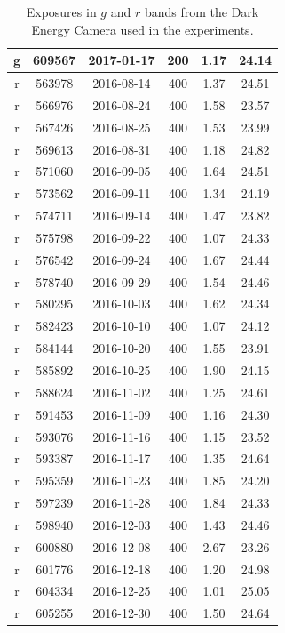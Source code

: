 \documentclass[letterpaper,preprint]{aastex62}
\begin{document}
\begin{table}
\begin{center}
\begin{scriptsize}
\begin{tabular}{cccccc}
      g & 609567 & 2017-01-17 & 200 & 1.17 & 24.14 \\
      \hline
      r & 563978 & 2016-08-14 & 400 & 1.37 & 24.51 \\
      r & 566976 & 2016-08-24 & 400 & 1.58 & 23.57 \\
      r & 567426 & 2016-08-25 & 400 & 1.53 & 23.99 \\
      r & 569613 & 2016-08-31 & 400 & 1.18 & 24.82 \\
      r & 571060 & 2016-09-05 & 400 & 1.64 & 24.51 \\
      r & 573562 & 2016-09-11 & 400 & 1.34 & 24.19 \\
      r & 574711 & 2016-09-14 & 400 & 1.47 & 23.82 \\
      r & 575798 & 2016-09-22 & 400 & 1.07 & 24.33 \\
      r & 576542 & 2016-09-24 & 400 & 1.67 & 24.44 \\
      r & 578740 & 2016-09-29 & 400 & 1.54 & 24.46 \\
      r & 580295 & 2016-10-03 & 400 & 1.62 & 24.34 \\
      r & 582423 & 2016-10-10 & 400 & 1.07 & 24.12 \\
      r & 584144 & 2016-10-20 & 400 & 1.55 & 23.91 \\
      r & 585892 & 2016-10-25 & 400 & 1.90 & 24.15 \\
      r & 588624 & 2016-11-02 & 400 & 1.25 & 24.61 \\
      r & 591453 & 2016-11-09 & 400 & 1.16 & 24.30 \\
      r & 593076 & 2016-11-16 & 400 & 1.15 & 23.52 \\
      r & 593387 & 2016-11-17 & 400 & 1.35 & 24.64 \\
      r & 595359 & 2016-11-23 & 400 & 1.85 & 24.20 \\
      r & 597239 & 2016-11-28 & 400 & 1.84 & 24.33 \\
      r & 598940 & 2016-12-03 & 400 & 1.43 & 24.46 \\
      r & 600880 & 2016-12-08 & 400 & 2.67 & 23.26 \\
      r & 601776 & 2016-12-18 & 400 & 1.20 & 24.98 \\
      r & 604334 & 2016-12-25 & 400 & 1.01 & 25.05 \\
      r & 605255 & 2016-12-30 & 400 & 1.50 & 24.64 \\
      \hline
    \end{tabular}
    \caption{Exposures in $g$ and $r$ bands from the Dark Energy
      Camera used in the experiments.\label{tab:exposures}}
    \end{scriptsize}
  \end{center}
\end{table}
\end{document}
